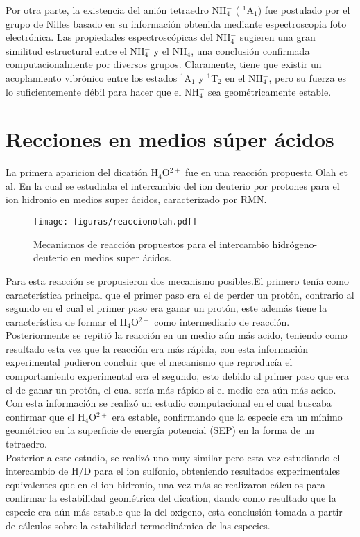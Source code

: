 \documentclass[12pt]{report}
\begin{document}
Por otra parte, la existencia del anión tetraedro NH$_4^-$ ( $^1$A$_1$) fue postulado por el grupo de Nilles\cite{Nilles2002} basado en su información obtenida mediante espectroscopia foto electrónica. Las propiedades espectroscópicas del NH$_4^-$ sugieren una gran similitud estructural entre el NH$_4^-$ y el NH$_4$, una conclusión confirmada computacionalmente por diversos grupos. Claramente, tiene que existir un acoplamiento vibrónico entre los estados $^1$A$_1$ y $^1$T$_2$ en el NH$_4^-$, pero su fuerza es lo suficientemente débil para hacer que el NH$_4^-$ sea geométricamente estable.


\newpage
\section{Recciones en medios súper ácidos}

La primera aparicion del dicatión H$_4$O$^{2+}$ fue en una reacción propuesta Olah et al\cite{Olah1986}. En la cual se estudiaba el intercambio del ion deuterio por protones para el ion hidronio en medios super ácidos, caracterizado por RMN. 

\begin{figure}[h]
\centering
\texttt{[image: figuras/reaccionolah.pdf]} 
\caption{Mecanismos de reacción propuestos para el intercambio hidrógeno-deuterio en medios super ácidos.\cite{Olah1986}}
\end{figure}

Para esta reacción se propusieron dos mecanismo posibles.El primero tenía como característica principal que el primer paso era el de perder un protón, contrario al segundo en el cual el primer paso era ganar un protón, este además tiene la característica de formar el H$_4$O$^{2+}$ como intermediario de reacción. Posteriormente se repitió la reacción en un medio aún más acido, teniendo como resultado esta vez que la reacción era más rápida, con esta información experimental pudieron concluir que el mecanismo que reproducía el comportamiento experimental era el segundo, esto debido al primer paso que era el de ganar un protón, el cual sería más rápido si el medio era aún más acido. Con esta información se realizó un estudio computacional en el cual buscaba confirmar que el H$_4$O$^{2+}$ era estable, confirmando que la especie era un mínimo geométrico en la superficie de energía potencial (SEP) en la forma de un tetraedro.\\

\newpage
Posterior a este estudio, se realizó uno muy similar \cite{Olah1988} pero esta vez estudiando el intercambio de H/D para el ion sulfonio, obteniendo resultados experimentales equivalentes que en el ion hidronio, una vez más se realizaron cálculos para confirmar la estabilidad geométrica del dication, dando como resultado que la especie era aún más estable que la del oxígeno, esta conclusión tomada a partir de cálculos sobre la estabilidad termodinámica de las especies.\\
\end{document}
